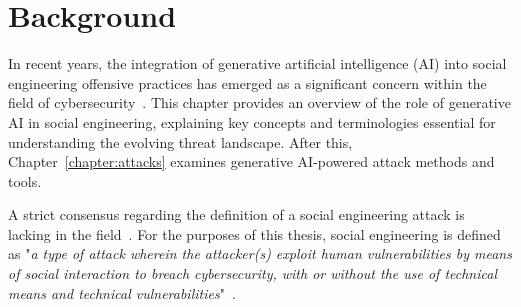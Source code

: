 


\chapter{Background\label{chapter:definition}}
\begin{comment}

Guides:
    - Pages: 2-3
    - Context and terminology (käsitteet), challenges and measurement criteria, values, research question analysis
    - Tarkentaa tavoiteet ja osakysymykset, vertailukriteerit (jotka jäsentävät muita lukuja)

TODO:
    [ ] 

What to cover:
    - What is cybersecurity and why it's of paramount importance
    - What is social engineering
        - Brief history of social engineering
            - Phishing in 1996 via AOL
    - Attacks, classical social engineering attacks
        - Phishing, vishing, smishing
    - Countermeasures, classical
        - User awareness & training programs
        - Company policy & company culture
    - Typical challenges

From study materials:
    - "Konteksti ja käsitteet, haasteet ja arviointikriteerit, arvot, tutkimuskysymysten analyysi"

\end{comment}




%
%
In recent years, the integration of generative artificial intelligence (AI) into social engineering offensive practices has emerged as a significant concern within the field of cybersecurity~\citep{blauth_AI_Crime_Overview_Malicious_Use_Abuse_2022, king_AI_Crime_Interdisciplinary_Analysis_2019, mirsky_Threat_Offensive_AI_Organizations_2023}. This chapter provides an overview of the role of generative AI in social engineering, explaining key concepts and terminologies essential for understanding the evolving threat landscape. After this, Chapter~\ref{chapter:attacks} examines generative AI-powered attack methods and tools.





%
%
A strict consensus regarding the definition of a social engineering attack is lacking in the field~\citep{hatfield_SE_Evolution_Concept_2018}. For the purposes of this thesis, social engineering is defined as "\textit{a type of attack wherein the attacker(s) exploit human vulnerabilities by means of social interaction to breach cybersecurity, with or without the use of technical means and technical vulnerabilities}"~\citep{wang_Defining_Social_Engineering_2020}.

